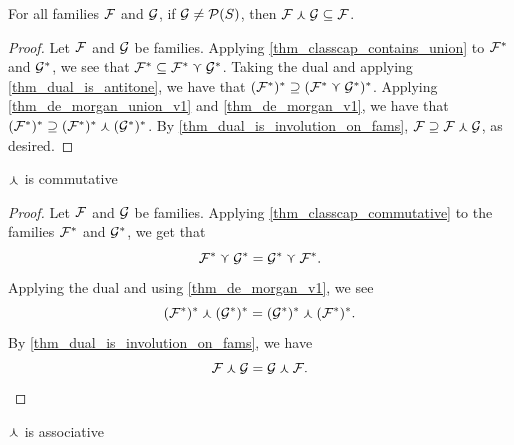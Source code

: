 \begin{theorem}
    \label{thm_classcapdual_contained_in_intersection}
     For all families $\mathcal{F}$ and $\mathcal{G}$, if $\mathcal{G} \neq \mathcal{P}(S)$, then $\mathcal{F} \curlywedge \mathcal{G} \subseteq \mathcal{F}$.
\end{theorem}

\begin{proof}
     Let $\mathcal{F}$ and $\mathcal{G}$ be families.  Applying \cref{thm_classcap_contains_union} to $\mathcal{F}^*$ and $\mathcal{G}^*$, we see that $\mathcal{F}^* \subseteq \mathcal{F}^* \curlyvee \mathcal{G}^*$. Taking the dual and applying \cref{thm_dual_is_antitone}, we have that $(\mathcal{F}^*)^* \supseteq (\mathcal{F}^* \curlyvee \mathcal{G}^*)^*$.  Applying \cref{thm_de_morgan_union_v1} and \cref{thm_de_morgan_v1}, we have that $(\mathcal{F}^*)^* \supseteq (\mathcal{F}^*)^* \curlywedge (\mathcal{G}^*)^*$.  By \cref{thm_dual_is_involution_on_fams}, $\mathcal{F} \supseteq \mathcal{F} \curlywedge \mathcal{G}$, as desired.
\end{proof}

\begin{theorem}
    \label{thm_classcapdual_commutative}
    $\curlywedge$ is commutative
\end{theorem}


\begin{proof}
    Let $\mathcal{F}$ and $\mathcal{G}$ be families.  Applying \cref{thm_classcap_commutative} to the families $\mathcal{F}^*$ and $\mathcal{G}^*$, we get that
    \[\mathcal{F}^* \curlyvee \mathcal{G}^* = \mathcal{G}^* \curlyvee \mathcal{F}^*.\]
    Applying the dual and using \cref{thm_de_morgan_v1}, we see
    \[(\mathcal{F}^*)^* \curlywedge (\mathcal{G}^*)^* = (\mathcal{G}^*)^* \curlywedge (\mathcal{F}^*)^*.\]
    By \cref{thm_dual_is_involution_on_fams}, we have
    \[\mathcal{F} \curlywedge \mathcal{G} = \mathcal{G} \curlywedge \mathcal{F}.\]
\end{proof}

\begin{theorem}
    \label{thm_classcapdual_associative}
    $\curlywedge$ is associative
\end{theorem}

